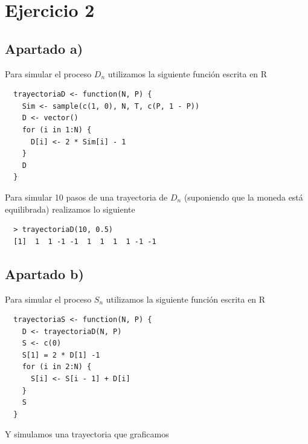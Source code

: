 \documentclass[11pt]{article}
\begin{document}

\section{Ejercicio 2}

\subsection*{Apartado a)}
Para simular el proceso $ D_n $ utilizamos la siguiente función escrita en R

\begin{verbatim}
  trayectoriaD <- function(N, P) {
    Sim <- sample(c(1, 0), N, T, c(P, 1 - P))
    D <- vector()
    for (i in 1:N) {
      D[i] <- 2 * Sim[i] - 1
    }
    D
  }
\end{verbatim}

Para simular 10 pasos de una trayectoria de $ D_n $ (suponiendo que la moneda
está equilibrada) realizamos lo siguiente
\begin{verbatim}
  > trayectoriaD(10, 0.5)
  [1]  1  1 -1 -1  1  1  1  1 -1 -1
\end{verbatim}


\subsection*{Apartado b)}
Para simular el proceso $ S_n $ utilizamos la siguiente función escrita en R

\begin{verbatim}
  trayectoriaS <- function(N, P) {
    D <- trayectoriaD(N, P)
    S <- c(0)
    S[1] = 2 * D[1] -1
    for (i in 2:N) {
      S[i] <- S[i - 1] + D[i]
    }
    S
  }
\end{verbatim}

Y simulamos una trayectoria que graficamos
\end{document}
